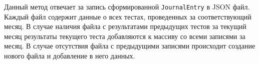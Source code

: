 Данный метод отвечает за запись сформированной \texttt{JournalEntry} в JSON файл. Каждый файл содержит данные о всех
тестах, проведенных за соответствующий месяц. В случае наличия файла с результатами предыдущих тестов за текущий месяц
результаты текущего теста добавляются к массиву со всеми записями за месяц. В случае отсутствия файла с предыдущими
записями происходит создание нового файла и добавление в него данных.
